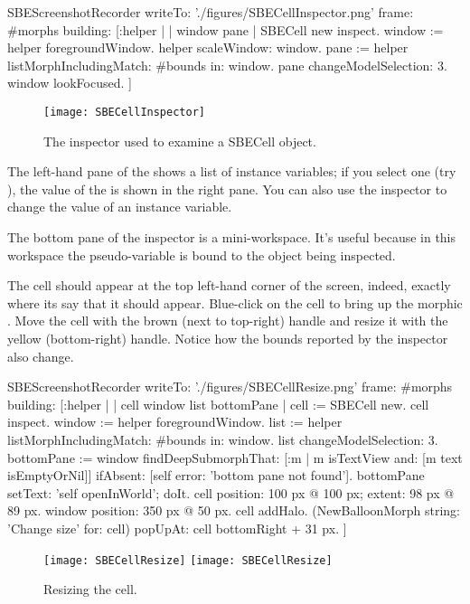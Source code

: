 \documentclass[a4paper,10pt,twoside]{book}
\begin{document}
\begin{ExecuteSmalltalkScript}
SBEScreenshotRecorder writeTo: './figures/SBECellInspector.png' frame: #morphs building: [:helper |
	| window pane |
	SBECell new inspect.
	window := helper foregroundWindow.
	helper scaleWindow: window.
	pane := helper listMorphIncludingMatch: #bounds in: window.
	pane changeModelSelection: 3.
	window lookFocused.
]
\end{ExecuteSmalltalkScript}
\begin{figure}[htbp]
   \centering
   \texttt{[image: SBECellInspector]}
   \caption{The inspector used to examine a SBECell object.\label{fig:SBECellInspector}}
\end{figure}

The left-hand pane of the  shows a list of instance variables; if you select one (try \mbox{),} the value of the  is shown in the right pane.
You can also use the inspector to change the value of an instance variable.


The bottom pane of the inspector is a mini-workspace.
It's useful because in this workspace the pseudo-variable \self is bound to the object being inspected.

The cell should appear at the top left-hand corner of the screen, indeed, exactly where its  say that it should appear.
Blue-click on the cell to bring up the morphic .
Move the cell with the brown (next to top-right) handle and resize it with the yellow (bottom-right) handle.
Notice how the bounds reported by the inspector also change.

\begin{ExecuteSmalltalkScript}
SBEScreenshotRecorder writeTo: './figures/SBECellResize.png' frame: #morphs building: [:helper |
  | cell window list bottomPane |
  cell := SBECell new.
  cell inspect.
  window := helper foregroundWindow.
  list := helper listMorphIncludingMatch: #bounds in: window.
  list changeModelSelection: 3.
  bottomPane := window findDeepSubmorphThat: [:m | m isTextView and: [m text isEmptyOrNil]] ifAbsent: [self error: 'bottom pane not found'].
  bottomPane setText: 'self openInWorld'; doIt.
  cell position: 100 px @ 100 px; extent: 98 px @ 89 px.
  window position: 350 px @ 50 px.
  cell addHalo.
  (NewBalloonMorph string: 'Change size' for: cell) popUpAt: cell bottomRight + 31 px.
]
\end{ExecuteSmalltalkScript}
\begin{figure}[htbp]
\centering
\ifluluelse
	{\texttt{[image: SBECellResize]} }
	{\texttt{[image: SBECellResize]} }
\caption{Resizing the cell.\label{fig:cellresize}}
\end{figure}
\end{document}
